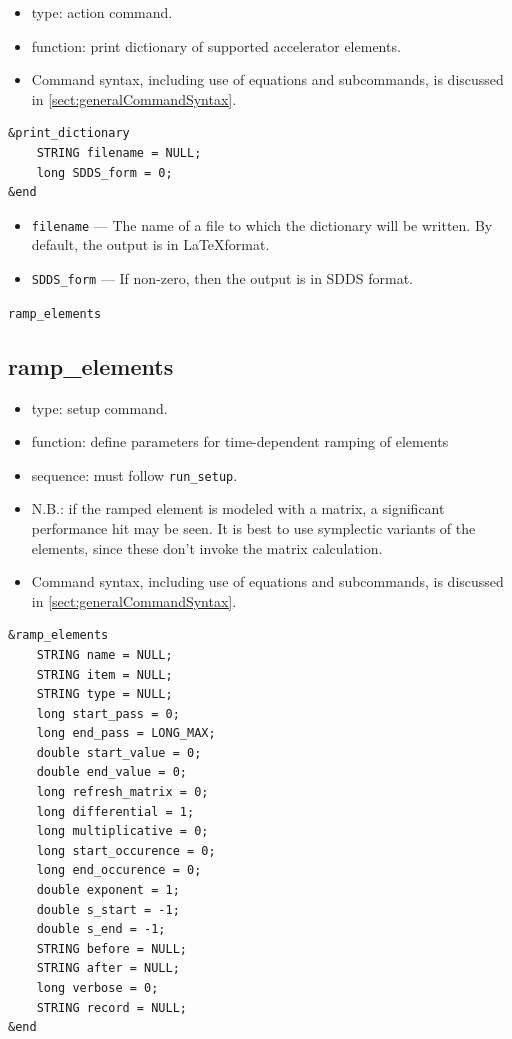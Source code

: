 \documentclass[11pt]{article}
\begin{document}
\begin{itemize}
\item type: action command.
\item function: print dictionary of supported accelerator elements.
\item Command syntax, including use of equations and subcommands, is discussed in \ref{sect:generalCommandSyntax}.
\end{itemize}

\begin{verbatim}
&print_dictionary
    STRING filename = NULL;
    long SDDS_form = 0;
&end
\end{verbatim}

\begin{itemize}
\item \verb|filename| --- The name of a file to which the dictionary will be written.  By default, the 
  output is in \LaTeX format.
\item \verb|SDDS_form| --- If non-zero, then the output is in  SDDS format.
\end{itemize}

\newpage
\begin{center}{\Large\verb|ramp_elements|}\end{center}
\subsection{ramp\_elements\label{subsec:rampelements}}

\begin{itemize}
\item type: setup command.
\item function: define parameters for time-dependent ramping of elements
\item sequence: must follow \verb|run_setup|.
\item N.B.: if the ramped element is modeled with a matrix, a significant performance hit may be seen.
  It is best to use symplectic variants of the elements, since these don't invoke the matrix calculation.
\item Command syntax, including use of equations and subcommands, is discussed in \ref{sect:generalCommandSyntax}.
\end{itemize}

\begin{verbatim}
&ramp_elements
    STRING name = NULL;
    STRING item = NULL;
    STRING type = NULL;
    long start_pass = 0;
    long end_pass = LONG_MAX;
    double start_value = 0;
    double end_value = 0;
    long refresh_matrix = 0;
    long differential = 1;
    long multiplicative = 0;
    long start_occurence = 0;
    long end_occurence = 0;
    double exponent = 1;
    double s_start = -1;
    double s_end = -1;
    STRING before = NULL;
    STRING after = NULL;
    long verbose = 0;
    STRING record = NULL;
&end
\end{verbatim}
\end{document}
